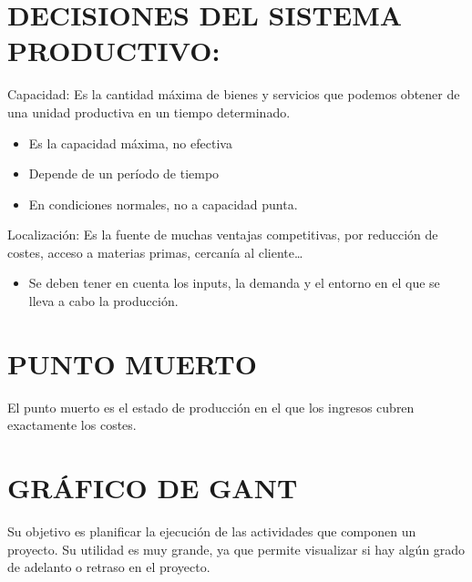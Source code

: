\documentclass[12pt, twoside, openright]{report} %
\begin{document}
\section{DECISIONES DEL SISTEMA PRODUCTIVO:}

Capacidad: Es la cantidad máxima de bienes y servicios que podemos obtener de una unidad productiva en un tiempo determinado.
\begin{itemize}
	\item Es la capacidad máxima, no efectiva
	\item Depende de un período de tiempo
	\item En condiciones normales, no a capacidad punta.
\end{itemize}
Localización: Es la fuente de muchas ventajas competitivas, por reducción de costes, acceso a materias primas, cercanía al cliente…
\begin{itemize}
	\item Se deben tener en cuenta los inputs, la demanda y el entorno en el que se lleva a cabo la producción.
\end{itemize}

\section{PUNTO MUERTO}

El punto muerto es el estado de producción en el que los ingresos cubren exactamente los costes.

\section{GRÁFICO DE GANT}
Su objetivo es planificar la ejecución de las actividades que componen un proyecto. Su utilidad es muy grande, ya que permite visualizar si hay algún grado de adelanto o retraso en el proyecto.
\end{document}
